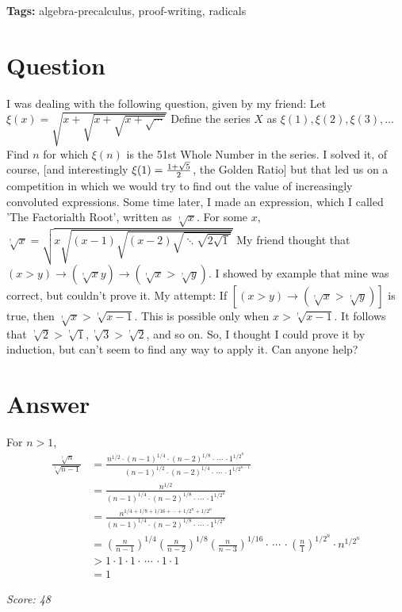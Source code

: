 \documentclass{article}
\title{The \textbackslash{}&\textbackslash{}#39;Factorialth Root\textbackslash{}&\textbackslash{}#39;}
\author{Stack Exchange}
\date{}
\begin{document}
\maketitle

\noindent\textbf{Tags:} algebra-precalculus, proof-writing, radicals

\section*{Question}
I was dealing with the following question, given by my friend: Let $\xi(x)=\sqrt{x+\sqrt{x+\sqrt{x+\sqrt{\cdots}}}}$ Define the series $X$ as $\xi(1),\xi(2),\xi(3),\dots$ Find $n$ for which $\xi(n)$ is the 51st Whole Number in the series. I solved it, of course, [and interestingly $\xi(1)={{1+\sqrt5}\over2}$, the Golden Ratio] but that led us on a competition in which we would try to find out the value of increasingly convoluted expressions. Some time later, I made an expression, which I called 'The Factorialth Root', written as $\sqrt[!]{x}$. For some $x$, $\sqrt[!]{x}=\sqrt{x\sqrt{(x-1)\sqrt{(x-2)\sqrt{\ddots\sqrt{2\sqrt1}}}}}$ My friend thought that $(x>y)\to(\sqrt[!]{x}y)\to(\sqrt[!]{x}>\sqrt[!]{y})$. I showed by example that mine was correct, but couldn't prove it. My attempt: If $[(x>y)\to(\sqrt[!]{x}>\sqrt[!]{y})]$ is true, then $\sqrt[!]{x}>\sqrt[!]{x-1}$. This is possible only when $x>\sqrt[!]{x-1}$. It follows that $\sqrt[!]{2}>\sqrt[!]{1},\sqrt[!]{3}>\sqrt[!]{2}$, and so on. So, I thought I could prove it by induction, but can't seem to find any way to apply it. Can anyone help?

\section*{Answer}
For $n > 1$, $$\begin{align} \frac{\sqrt[!]{n}}{\sqrt[!]{n-1}} &= \frac{n^{1/2} \cdot (n-1)^{1/4} \cdot (n-2)^{1/8} \cdot\,\cdots\,\cdot 1^{1/2^{n\phantom{-1}}}}{\phantom{n^{1/2}\cdot}(n-1)^{1/2}\cdot(n-2)^{1/4}\cdot\,\cdots\,\cdot 1^{1/2^{n-1}}} \\[4pt] &= \frac{n^{1/2}}{(n-1)^{1/4}\cdot(n-2)^{1/8}\cdot\,\cdots\,\cdot 1^{1/2^n}} \\[4pt] &= \frac{n^{1/4+1/8+1/16+\cdots+1/2^{n}+1/2^{n}}}{(n-1)^{1/4}\cdot(n-2)^{1/8}\cdot\,\cdots\,\cdot 1^{1/2^n}} \\[4pt] &= \left(\frac{n}{n-1}\right)^{1/4}\left(\frac{n}{n-2}\right)^{1/8}\left(\frac{n}{n-3}\right)^{1/16}\cdot\,\cdots\,\cdot \left(\frac{n}{1}\right)^{1/2^{n}}\cdot n^{1/2^n} \\[4pt] &> 1 \cdot 1 \cdot 1 \cdot\,\cdots\,\cdot1 \cdot 1 \\[4pt] &= 1 \end{align}$$

\vspace{1em}
\noindent\textit{Score: 48}
\end{document}
